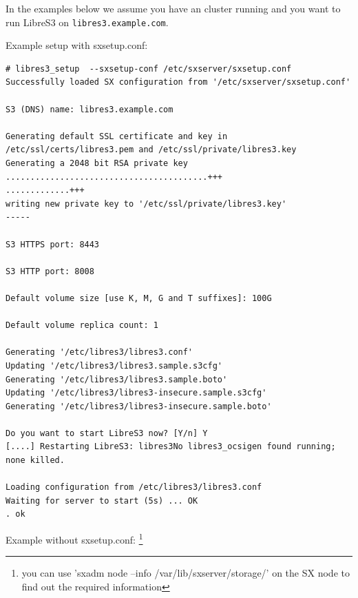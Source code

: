 In the examples below we assume you
have an \SX cluster running and you want to run
LibreS3 on \verb|libres3.example.com|.

Example setup with sxsetup.conf:

\begin{lstlisting}
# libres3_setup  --sxsetup-conf /etc/sxserver/sxsetup.conf
Successfully loaded SX configuration from '/etc/sxserver/sxsetup.conf'

S3 (DNS) name: libres3.example.com

Generating default SSL certificate and key in /etc/ssl/certs/libres3.pem and /etc/ssl/private/libres3.key
Generating a 2048 bit RSA private key
.........................................+++
.............+++
writing new private key to '/etc/ssl/private/libres3.key'
-----

S3 HTTPS port: 8443

S3 HTTP port: 8008

Default volume size [use K, M, G and T suffixes]: 100G

Default volume replica count: 1

Generating '/etc/libres3/libres3.conf'
Updating '/etc/libres3/libres3.sample.s3cfg'
Generating '/etc/libres3/libres3.sample.boto'
Updating '/etc/libres3/libres3-insecure.sample.s3cfg'
Generating '/etc/libres3/libres3-insecure.sample.boto'

Do you want to start LibreS3 now? [Y/n] Y
[....] Restarting LibreS3: libres3No libres3_ocsigen found running; none killed.

Loading configuration from /etc/libres3/libres3.conf
Waiting for server to start (5s) ... OK
. ok
\end{lstlisting}


Example without sxsetup.conf:
\footnote{you can use 'sxadm node --info /var/lib/sxserver/storage/' on the SX node to find out the required information}

